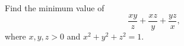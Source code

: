Find the minimum value of
\[\dfrac{xy}{z}+\dfrac{xz}{y}+\dfrac{yz}{x},\]
where $x,y,z>0$ and $x^2+y^2+z^2=1$.
